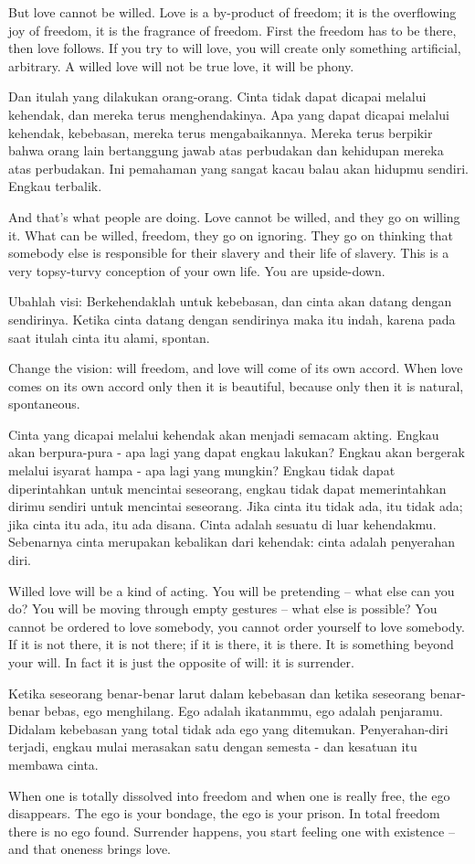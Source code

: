 \english
But love cannot be willed. Love is a by-product of freedom; it is the overflowing joy of freedom, it is the fragrance of freedom. First the freedom has to be there, then love follows. If you try to will love, you will create only something artificial, arbitrary. A willed love will not be true love, it will be phony.

\bahasa
Dan itulah yang dilakukan orang-orang. Cinta tidak dapat dicapai melalui kehendak, dan mereka terus menghendakinya. Apa yang dapat dicapai melalui kehendak, kebebasan, mereka terus mengabaikannya. Mereka terus berpikir bahwa orang lain bertanggung jawab atas perbudakan dan kehidupan mereka atas perbudakan. Ini pemahaman yang sangat kacau balau akan hidupmu sendiri. Engkau terbalik.

\english
And that's what people are doing. Love cannot be willed, and they go on willing it. What can be willed, freedom, they go on ignoring. They go on thinking that somebody else is responsible for their slavery and their life of slavery. This is a very topsy-turvy conception of your own life. You are upside-down.

\bahasa
Ubahlah visi: Berkehendaklah untuk kebebasan, dan cinta akan datang dengan sendirinya. Ketika cinta datang dengan sendirinya maka itu indah, karena pada saat itulah cinta itu alami, spontan.

\english
Change the vision: will freedom, and love will come of its own accord. When love comes on its own accord only then it is beautiful, because only then it is natural, spontaneous.

\bahasa
Cinta yang dicapai melalui kehendak akan menjadi semacam akting. Engkau akan berpura-pura - apa lagi yang dapat engkau lakukan? Engkau akan bergerak melalui isyarat hampa - apa lagi yang mungkin? Engkau tidak dapat diperintahkan untuk mencintai seseorang, engkau tidak dapat memerintahkan dirimu sendiri untuk mencintai seseorang. Jika cinta itu tidak ada, itu tidak ada; jika cinta itu ada, itu ada disana. Cinta adalah sesuatu di luar kehendakmu. Sebenarnya cinta merupakan kebalikan dari kehendak: cinta adalah penyerahan diri.

\english
Willed love will be a kind of acting. You will be pretending -- what else can you do? You will be moving through empty gestures -- what else is possible? You cannot be ordered to love somebody, you cannot order yourself to love somebody. If it is not there, it is not there; if it is there, it is there. It is something beyond your will. In fact it is just the opposite of will: it is surrender.

\bahasa
Ketika seseorang benar-benar larut dalam kebebasan dan ketika seseorang benar-benar bebas, ego menghilang. Ego adalah ikatanmmu, ego adalah penjaramu. Didalam kebebasan yang total tidak ada ego yang ditemukan. Penyerahan-diri terjadi, engkau mulai merasakan satu dengan semesta - dan kesatuan itu membawa cinta.

\english
When one is totally dissolved into freedom and when one is really free, the ego disappears. The ego is your bondage, the ego is your prison. In total freedom there is no ego found. Surrender happens, you start feeling one with existence -- and that oneness brings love.

